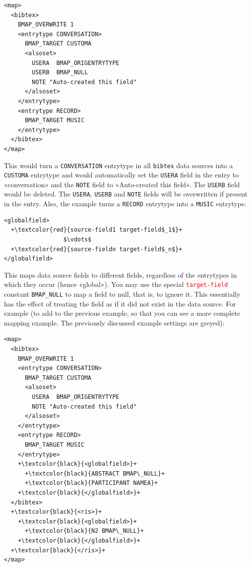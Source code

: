 \documentclass{ltxdockit}
\begin{document}
\lstset{showspaces=false}
\begin{lstlisting}[escapechar=+,mathescape=true]
<map>
  <bibtex>
    BMAP_OVERWRITE 1
    <entrytype CONVERSATION>
      BMAP_TARGET CUSTOMA
      <alsoset>
        USERA  BMAP_ORIGENTRYTYPE
        USERB  BMAP_NULL
        NOTE "Auto-created this field"
      </alsoset>
    </entrytype>
    <entrytype RECORD>
      BMAP_TARGET MUSIC
    </entrytype>
  </bibtex>
</map>
\end{lstlisting}

\noindent This would turn a \verb+CONVERSATION+ entrytype in all
\verb+bibtex+ data sources into a \verb+CUSTOMA+ entrytype
and would automatically set the \verb+USERA+ field in the entry to
«conversation» and the \verb+NOTE+ field to «Auto-created this field». The
\verb+USERB+ field would be deleted. The
\verb+USERA+, \verb+USERB+ and \verb+NOTE+ fields will be overwritten if present in the
entry. Also, the example turns a \verb+RECORD+ entrytype into a \verb+MUSIC+ entrytype.
\bigskip
{}

\lstset{showspaces=false}
\begin{lstlisting}[escapechar=+,mathescape=true]
<globalfield>
  +\textcolor{red}{source-field1 target-field$_1$}+
                 $\vdots$
  +\textcolor{red}{source-fieldn target-field$_n$}+
</globalfield>
\end{lstlisting}

\noindent This maps data source fields to different fields,
regardless of the entrytypes in which they occur (hence «global»). You may
use the special \textcolor{red}{\texttt{target-field}} constant \verb+BMAP_NULL+
to map a field to null, that is, to ignore it. This essentially has the
effect of treating the field as if it did not exist in the data source. For
example (to add to the previous example, so that you can see a more
complete mapping example. The previously discussed example settings are greyed):

{\color{grey}
\lstset{showspaces=false}
\begin{lstlisting}[escapechar=+,mathescape=true]
<map>
  <bibtex>
    BMAP_OVERWRITE 1
    <entrytype CONVERSATION>
      BMAP_TARGET CUSTOMA
      <alsoset>
        USERA  BMAP_ORIGENTRYTYPE
        NOTE "Auto-created this field"
      </alsoset>
    </entrytype>
    <entrytype RECORD>
      BMAP_TARGET MUSIC
    </entrytype>
    +\textcolor{black}{<globalfield>}+
      +\textcolor{black}{ABSTRACT BMAP\_NULL}+
      +\textcolor{black}{PARTICIPANT NAMEA}+
    +\textcolor{black}{</globalfield>}+
  </bibtex>
  +\textcolor{black}{<ris>}+
    +\textcolor{black}{<globalfield>}+
      +\textcolor{black}{N2 BMAP\_NULL}+
    +\textcolor{black}{</globalfield>}+
  +\textcolor{black}{</ris>}+
</map>
\end{lstlisting}
}
\end{document}

